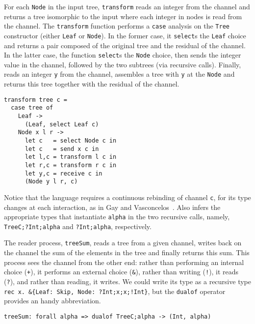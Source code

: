 For each \lstinline|Node| in the input tree, \lstinline|transform|
reads an integer from the channel and returns a tree isomorphic to the
input where each integer in nodes is read from the channel.
%
The \lstinline|transform| function performs a \lstinline|case|
analysis on the \lstinline|Tree| constructor (either \lstinline|Leaf|
or \lstinline|Node|). In the former case, it \lstinline|select|s the
\lstinline|Leaf| choice and returns a pair composed of the original
tree and the residual of the channel. In the latter case, the function
\lstinline|select|s the \lstinline|Node| choice, then sends the
integer value in the channel, followed by the two subtrees (via recursive
calls). Finally, reads an integer \lstinline|y| from the channel,
assembles a tree with \lstinline|y| at the \lstinline|Node| and
returns this tree together with the residual of the channel.
%
\begin{lstlisting}
transform tree c =
  case tree of
    Leaf ->
      (Leaf, select Leaf c)
    Node x l r ->
      let c   = select Node c in
      let c   = send x c in
      let l,c = transform l c in
      let r,c = transform r c in
      let y,c = receive c in
      (Node y l r, c)
\end{lstlisting}

Notice that the language requires a continuous rebinding of channel
\lstinline|c|, for its type changes at each interaction, as in Gay and
Vasconcelos~\cite{DBLP:journals/jfp/GayV10}. Also \freest{} infers the
appropriate types that instantiate \lstinline|alpha| in the two
recursive calls, namely, \lstinline|TreeC;?Int;alpha| and
\lstinline|?Int;alpha|, respectively.

The reader process, \lstinline|treeSum|, reads a tree from a given
channel, writes back on the channel the sum of the elements in the
tree and finally returns this sum. This process sees the channel from the
other end: rather than performing an internal choice (\lstinline|+|),
it performs an external choice (\lstinline|&|), rather than writing
(\lstinline|!|), it reads (\lstinline|?|), and rather than reading, it
writes. We could write its type as a recursive type
\lstinline|rec x. &{Leaf: Skip, Node: ?Int;x;x;!Int}|,
but the \lstinline|dualof| operator provides an handy abbreviation.
%
\begin{lstlisting}
treeSum: forall alpha => dualof TreeC;alpha -> (Int, alpha)
\end{lstlisting}

